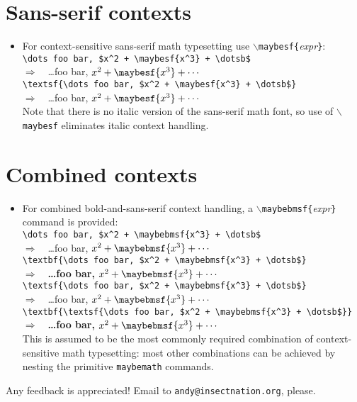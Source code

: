 \documentclass[12pt]{article}
\newcommand{\maybemath}{\texttt{maybemath}\xspace}
\newcommand{\manifestsAs}{\ensuremath{\Rightarrow\quad}\xspace}
\newcommand{\texcommand}[1]{\texttt{\ensuremath{\backslash{}}{#1}}\xspace}
\newcommand{\texarg}[1]{\ensuremath{\!}\texttt{\{}\textit{#1}\texttt{\}}\xspace}
\newcommand{\maybesfName}{\texcommand{maybesf}}
\newcommand{\maybebmsfName}{\texcommand{maybebmsf}}
\newcommand{\maybemathName}{\texcommand{maybemath}}
\begin{document}
\section{Sans-serif contexts}
\begin{itemize}
\item For context-sensitive sans-serif math typesetting use \maybesfName\texarg{expr}:\\
  {\verb|\dots foo bar, $x^2 + \maybesf{x^3} + \dotsb$|}\\ \manifestsAs {\dots foo bar, $x^2 + \maybesf{x^3} + \dotsb$}\\
  {\verb|\textsf{\dots foo bar, $x^2 + \maybesf{x^3} + \dotsb$}|}\\ \manifestsAs \textsf{\dots foo bar, $x^2 + \maybesf{x^3} + \dotsb$}\\
  Note that there is no italic version of the sans-serif math font, so use of \maybesfName eliminates italic context handling.
\end{itemize}


\section{Combined contexts}
\begin{itemize}
\item For combined bold-and-sans-serif context handling, a \maybebmsfName\texarg{expr} command is provided:\\
  {\verb|\dots foo bar, $x^2 + \maybebmsf{x^3} + \dotsb$|}\\ \manifestsAs {\dots foo bar, $x^2 + \maybebmsf{x^3} + \dotsb$}\\
  {\verb|\textbf{\dots foo bar, $x^2 + \maybebmsf{x^3} + \dotsb$}|}\\ \manifestsAs \textbf{\dots foo bar, $x^2 + \maybebmsf{x^3} + \dotsb$}\\
  {\verb|\textsf{\dots foo bar, $x^2 + \maybebmsf{x^3} + \dotsb$}|}\\ \manifestsAs \textsf{\dots foo bar, $x^2 + \maybebmsf{x^3} + \dotsb$}\\
  {\verb|\textbf{\textsf{\dots foo bar, $x^2 + \maybebmsf{x^3} + \dotsb$}}|}\\ \manifestsAs \textbf{\textsf{\dots foo bar, $x^2 + \maybebmsf{x^3} + \dotsb$}}\\
  This is assumed to be the most commonly required combination of context-sensitive math typesetting: most other combinations can be achieved by nesting the primitive \maybemath commands.
\end{itemize}


\noindent Any feedback is appreciated! Email to \texttt{andy@insectnation.org}, please.
\end{document}
